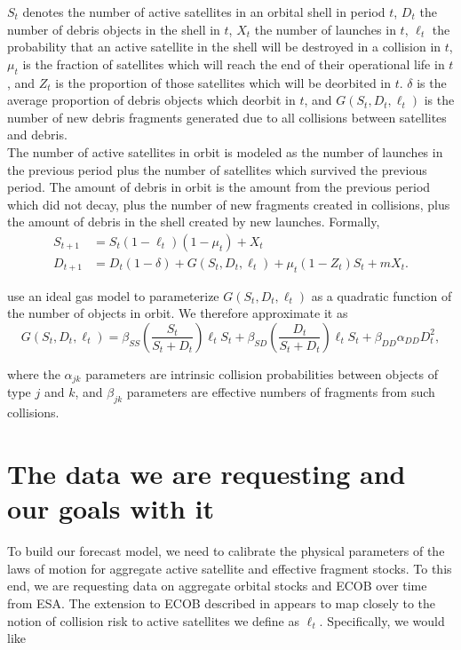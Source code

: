 \documentclass[12pt]{article}
\begin{document}
$S_t$ denotes the number of active satellites in an orbital shell in period $t$, $D_t$ the number of debris objects in the shell in $t$, $X_t$ the number of launches in $t$, $\ell_t$ the probability that an active satellite in the shell will be destroyed in a collision in $t$, $\mu_t$ is the fraction of satellites which will reach the end of their operational life in $t$, and $Z_t$ is the proportion of those satellites which will be deorbited in $t$. $\delta$ is the average proportion of debris objects which deorbit in $t$, and $G(S_t,D_t,\ell_t)$ is the number of new debris fragments generated due to all collisions between satellites and debris. \\

The number of active satellites in orbit is modeled as the number of launches in the previous period plus the number of satellites which survived the previous period. The amount of debris in orbit is the amount from the previous period which did not decay, plus the number of new fragments created in collisions, plus the amount of debris in the shell created by new launches. Formally,
\begin{align}
\label{satelliteLoM}
S_{t+1} &= S_t(1-\ell_t)(1-\mu_t) + X_t \\
\label{debrisLoM}
D_{t+1} &= D_t(1-\delta) + G(S_t,D_t,\ell_t) + \mu_t(1-Z_t)S_t + mX_t.
\end{align}

\cite{bradleywein2009} use an ideal gas model to parameterize $G(S_t,D_t,\ell_t)$ as a quadratic function of the number of objects in orbit. We therefore approximate it as
\begin{equation}
\label{growthFunction}
G(S_t,D_t,\ell_t) = \beta_{SS} \left( \frac{S_t}{S_t+D_t} \right ) \ell_t S_t + \beta_{SD}\left( \frac{D_t}{S_t+D_t} \right ) \ell_t S_t +  \beta_{DD} \alpha_{DD} D_t^2,
\end{equation}

where the $\alpha_{jk}$ parameters are intrinsic collision probabilities between objects of type $j$ and $k$, and $\beta_{jk}$ parameters are effective numbers of fragments from such collisions.

\section{The data we are requesting and our goals with it}	

To build our forecast model, we need to calibrate the physical parameters of the laws of motion for aggregate active satellite and effective fragment stocks. To this end, we are requesting data on aggregate orbital stocks and ECOB over time from ESA. The extension to ECOB described in \cite{letiziaetal2017} appears to map closely to the notion of collision risk to active satellites we define as $\ell_t$. Specifically, we would like
\end{document}
